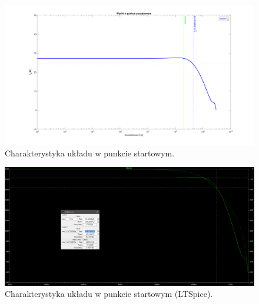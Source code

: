 \documentclass{article}
\begin{document}
\begin{landscape}
	\begin{figure}[h]
		\vspace*{-2cm}
		\includegraphics[width=25cm,height=15 cm]{graphics/starting_point.png}
		\centering
		\caption{Charakterystyka układu w punkcie startowym.}
	\end{figure}
\end{landscape}

\clearpage
\pagebreak
\begin{landscape}
	\begin{figure}[h]
		\vspace*{-2cm}
		\includegraphics[width=20cm,height=10 cm]{graphics/starting_point_spice.png}
		\centering
		\caption{Charakterystyka układu w punkcie startowym (LTSpice).}
	\end{figure}
\end{landscape}
\end{document}
